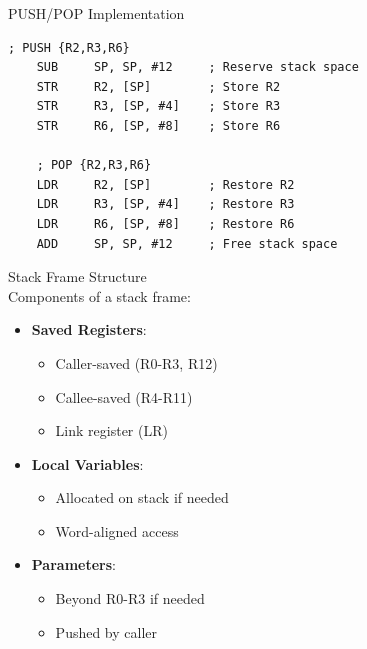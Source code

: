 \begin{example2}{PUSH/POP Implementation}
\begin{lstlisting}[language=armasm, style=basesmol]
    ; PUSH {R2,R3,R6}
    SUB     SP, SP, #12     ; Reserve stack space
    STR     R2, [SP]        ; Store R2
    STR     R3, [SP, #4]    ; Store R3
    STR     R6, [SP, #8]    ; Store R6

    ; POP {R2,R3,R6}
    LDR     R2, [SP]        ; Restore R2
    LDR     R3, [SP, #4]    ; Restore R3
    LDR     R6, [SP, #8]    ; Restore R6
    ADD     SP, SP, #12     ; Free stack space
\end{lstlisting}
\end{example2}





\begin{definition}{Stack Frame Structure}\\
Components of a stack frame:
\begin{itemize}
  \item \textbf{Saved Registers}:
    \begin{itemize}
      \item Caller-saved (R0-R3, R12)
      \item Callee-saved (R4-R11)
      \item Link register (LR)
    \end{itemize}
  \item \textbf{Local Variables}:
    \begin{itemize}
      \item Allocated on stack if needed
      \item Word-aligned access
    \end{itemize}
  \item \textbf{Parameters}:
    \begin{itemize}
      \item Beyond R0-R3 if needed
      \item Pushed by caller
    \end{itemize}
\end{itemize}

\end{definition}

